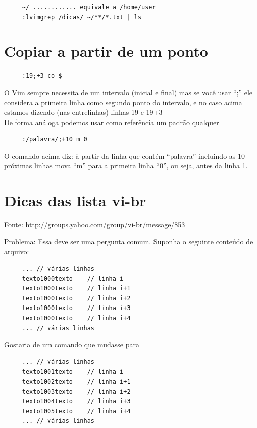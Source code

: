 \documentclass[10pt,a4paper,openany]{book}
\begin{document}
\begin{verbatim}
     ~/ ............ equivale a /home/user
     :lvimgrep /dicas/ ~/**/*.txt | ls
\end{verbatim}


\section{Copiar a partir de um ponto}

\begin{verbatim}
     :19;+3 co $
\end{verbatim}

O Vim sempre necessita de um intervalo (inicial e final) mas se você
usar ``;'' ele considera a primeira linha como segundo ponto do
intervalo, e no caso acima estamos dizendo (nas entrelinhas) linhas
19 e 19+3     \\


De forma análoga podemos usar como referência um padrão qualquer

\begin{verbatim}
     :/palavra/;+10 m 0
\end{verbatim}

O comando acima diz: à partir da linha que contém ``palavra'' incluindo as 10 próximas linhas
mova ``m'' para a primeira linha ``0'', ou seja, antes da linha 1.

\section{Dicas das lista vi-br}

 Fonte: \url{http://groups.yahoo.com/group/vi-br/message/853}

 Problema:
 Essa deve ser uma pergunta comum.
 Suponha o seguinte conteúdo de arquivo:

\begin{verbatim}
     ... // várias linhas
     texto1000texto    // linha i
     texto1000texto    // linha i+1
     texto1000texto    // linha i+2
     texto1000texto    // linha i+3
     texto1000texto    // linha i+4
     ... // várias linhas
\end{verbatim}

Gostaria de um comando que mudasse para

\begin{verbatim}
     ... // várias linhas
     texto1001texto    // linha i
     texto1002texto    // linha i+1
     texto1003texto    // linha i+2
     texto1004texto    // linha i+3
     texto1005texto    // linha i+4
     ... // várias linhas
\end{verbatim}
\end{document}
